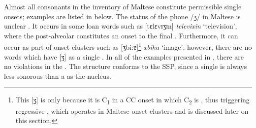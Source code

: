\documentclass[output=paper]{langsci/langscibook}
\begin{document}
Almost all consonants in the inventory of Maltese constitute permissible single onsets; examples are listed in  below. The status of the phone /ʒ/ in Maltese is unclear \citep[cf.][]{maltese_book}. It occurs in some loan words such as [tɛlɛvɪʒɪn] \textit{televixin} ‘television’, where the  post-alveolar  constitutes an onset to the final . Furthermore, it can occur as part of onset clusters such as [ʒbi:ɐ]\footnote{This [ʒ] is only  because it is C\textsubscript{1} in a CC onset in which C\textsubscript{2} is , thus triggering regressive , which operates in Maltese onset clusters and is discussed later on this section.}  \textit{xbiha} ‘image’; however, there are no  words which have [ʒ] as a single . In all of the examples presented in , there are no  violations in the . The structure conforms to the SSP, since a single  is always less sonorous than a  as the nucleus.
\end{document}
